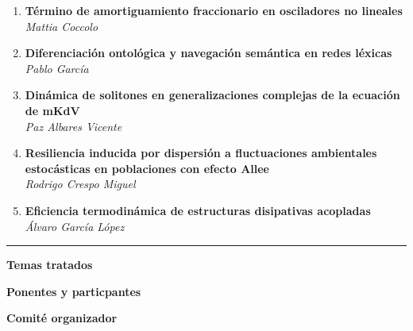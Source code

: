 \documentclass[11pt,a4paper]{article}
\begin{document}
\begin{center}
\begin{minipage}{0.9\textwidth}
\begin{enumerate}
  \item \textbf{Término de amortiguamiento fraccionario en osciladores no lineales} \\ \emph{Mattia Coccolo} \dotfill \ \hspace{0.1cm} \pageref{abs:9}

  \item \textbf{Diferenciación ontológica y navegación semántica en redes léxicas} \\ \emph{Pablo García} \dotfill \ \hspace{0.1cm} \pageref{abs:10}

  \item \textbf{Dinámica de solitones en generalizaciones complejas de la ecuación de mKdV} \\ \emph{Paz Albares Vicente} \dotfill \ \hspace{0.1cm} \pageref{abs:11}

  \item \textbf{Resiliencia inducida por dispersión a fluctuaciones ambientales estocásticas en poblaciones con efecto Allee} \\ \emph{Rodrigo Crespo Miguel} \dotfill \ \hspace{0.1cm} \pageref{abs:12}

  \item \textbf{Eficiencia termodinámica de estructuras disipativas acopladas} \\ \emph{Álvaro García López} \dotfill \ \hspace{0.1cm} \pageref{abs:13}

\end{enumerate}


\vspace{0.1cm}
\hrule
\vspace{0.1cm}

\hspace*{+0.95cm}%
\textbf{Temas tratados}
\dotfill
\pageref{sec:temas}

\medskip

\hspace*{+0.95cm}%
\textbf{Ponentes y particpantes}
\dotfill
\pageref{sec:ponentes}

\medskip

\hspace*{+0.95cm}%
\textbf{Comité organizador}
\dotfill
\pageref{sec:comite}



\end{minipage}
\end{center}
\end{document}
